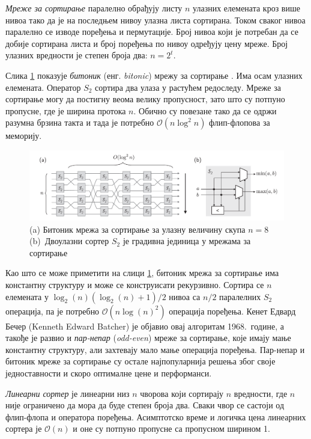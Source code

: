 \documentclass[12pt, a4paper]{article}
\theoremstyle{definition}
\begin{document}
\textit{Мреже за сортирање} паралелно обрађују листу $n$ улазних елемената кроз више нивоа тако да је на последњем нивоу улазна листа сортирана. Током сваког нивоа паралелно се изводе поређења и пермутације. Број нивоа који је потребан да се добије сортирана листа и број поређења по нивоу одређују цену мреже. Број улазних вредности је степен броја два: $n = 2^t$.

Слика \ref{fig:bitonicStages} показује \textit{битоник} (енг. \textit{bitonic}) мрежу за сортирање \cite{bitonicBatcher}. Има осам улазних елемената. Оператор $S_2$ сортира два улаза у растућем редоследу. Мреже за сортирање могу да постигну веома велику пропусност, зато што су потпуно пропусне, где је ширина протока $n$. Обично су повезане тако да се одржи разумна брзина такта и тада је потребно $\mathcal{O}(n \log^2 n)$ флип-флопова за меморију.
\begin{figure}[H]
  \centering
      \includegraphics[scale=0.24]{slike/bitonicStages.png}
  \caption{(a) Битоник мрежа за сортирање за улазну величину скупа $n = 8$ \mbox{(b) Двоулазни} сортер $S_2$ је градивна јединица у мрежама за сортирање}
  \label{fig:bitonicStages}
\end{figure}
Као што се може приметити на слици \ref{fig:bitonicStages}, битоник мрежа за сортирање има константну структуру и може се конструисати рекурзивно. Сортира се $n$ елемената у $\log_{2}(n)(\log_{2}(n)+1)/2$ нивоа са $n/2$ паралелних $S_2$ операција, па је потребно $\mathcal{O}(n\log(n)^2)$ операција поређења. Кенет Едвард Бечер (Kenneth Edward Batcher) је објавио овај алгоритам 1968.\ године, а такође је развио и \textit{пар-непар} (\textit{odd-even}) мреже за сортирање, које имају мање константну структуру, али захтевају мало мање операција поређења.
Пар-непар и битоник мреже за сортирање су остале најпопуларнија решења због своје једноставности и скоро оптималне цене и перформанси.

\textit{Линеарни сортер} је линеарни низ $n$ чворова који сортирају $n$ вредности, где $n$ није ограничено да мора да буде степен броја два. Сваки чвор се састоји од флип-флопа и оператора поређења. Асимптотско време и логичка цена линеарних сортера је $\mathcal{O}(n)$ и оне су потпуно пропусне са пропусном ширином 1.
\end{document}
